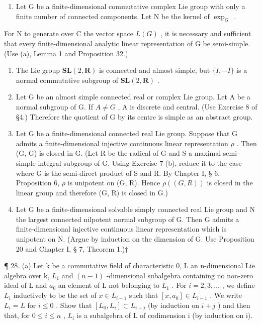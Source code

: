 \begin{enumerate}
\def\labelenumi{(\alph{enumi})}
\setcounter{enumi}{1}
\tightlist
\item
  Let G be a finite-dimensional commutative complex Lie group with only a finite number of connected components. Let N be the kernel of \(\exp_{G}\) .
\end{enumerate}

For N to generate over C the vector space \(L(G)\) , it is necessary and sufficient that every finite-dimensional analytic linear representation of G be semi-simple. (Use (a), Lemma 1 and Proposition 32.)

\begin{enumerate}
\def\labelenumi{\arabic{enumi}.}
\setcounter{enumi}{23}
\item
  The Lie group \(\mathbf{SL}(2,\mathbf{R})\) is connected and almost simple, but \(\{I,-I\}\) is a normal commutative subgroup of \(\mathbf{SL}(2,\mathbf{R})\) .
\item
  Let G be an almost simple connected real or complex Lie group. Let A be a normal subgroup of G. If \(A \neq G\) , A is discrete and central. (Use Exercise 8 of §4.) Therefore the quotient of G by its centre is simple as an abstract group.
\item
  Let G be a finite-dimensional connected real Lie group. Suppose that G admits a finite-dimensional injective continuous linear representation \(\rho\) . Then (G, G) is closed in G. (Let R be the radical of G and S a maximal semi-simple integral subgroup of G. Using Exercise 7 (b), reduce it to the case where G is the semi-direct product of S and R. By Chapter I, § 6, Proposition 6, \(\rho\) is unipotent on (G, R). Hence \(\rho((G, R))\) is closed in the linear group and therefore (G, R) is closed in G.)
\item
  Let G be a finite-dimensional solvable simply connected real Lie group and N the largest connected nilpotent normal subgroup of G. Then G admits a finite-dimensional injective continuous linear representation which is unipotent on N. (Argue by induction on the dimension of G. Use Proposition 20 and Chapter I, § 7, Theorem 1.)†
\end{enumerate}

¶ 28. (a) Let k be a commutative field of characteristic 0, L an n-dimensional Lie algebra over k, \(L_{1}\) and \((n-1)\) -dimensional subalgebra containing no non-zero ideal of L and \(a_{0}\) an element of L not belonging to \(L_{1}\) . For \(i=2,3,\ldots\) , we define \(L_{i}\) inductively to be the set of \(x\in L_{i-1}\) such that \([x,a_{0}]\in L_{i-1}\) . We write \(L_{i}=L\) for \(i\leqslant0\) . Show that \([L_{0},L_{i}]\subset L_{i+j}\) (by induction on \(i+j\) ) and then that, for \(0\leqslant i\leqslant n\) , \(L_{i}\) is a subalgebra of L of codimension i (by induction on i).


